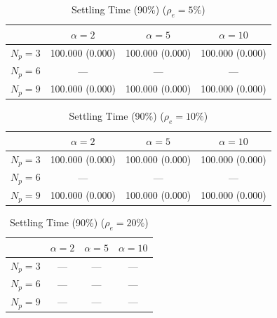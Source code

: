\begin{table}[htbp]
\centering
\begin{tabular}{lccc}
\toprule
 & $\alpha=2$ & $\alpha=5$ & $\alpha=10$ \\
\midrule
$N_p=3$ & 100.000 (0.000) & 100.000 (0.000) & 100.000 (0.000) \\
$N_p=6$ & --- & --- & --- \\
$N_p=9$ & 100.000 (0.000) & 100.000 (0.000) & 100.000 (0.000) \\
\bottomrule
\end{tabular}
\caption{Settling Time (90\%) ($\rho_e=5\%$)}
\label{tab:exp2_settling_time_90pct_rho5}
\end{table}


\begin{table}[htbp]
\centering
\begin{tabular}{lccc}
\toprule
 & $\alpha=2$ & $\alpha=5$ & $\alpha=10$ \\
\midrule
$N_p=3$ & 100.000 (0.000) & 100.000 (0.000) & 100.000 (0.000) \\
$N_p=6$ & --- & --- & --- \\
$N_p=9$ & 100.000 (0.000) & 100.000 (0.000) & 100.000 (0.000) \\
\bottomrule
\end{tabular}
\caption{Settling Time (90\%) ($\rho_e=10\%$)}
\label{tab:exp2_settling_time_90pct_rho10}
\end{table}


\begin{table}[htbp]
\centering
\begin{tabular}{lccc}
\toprule
 & $\alpha=2$ & $\alpha=5$ & $\alpha=10$ \\
\midrule
$N_p=3$ & --- & --- & --- \\
$N_p=6$ & --- & --- & --- \\
$N_p=9$ & --- & --- & --- \\
\bottomrule
\end{tabular}
\caption{Settling Time (90\%) ($\rho_e=20\%$)}
\label{tab:exp2_settling_time_90pct_rho20}
\end{table}
